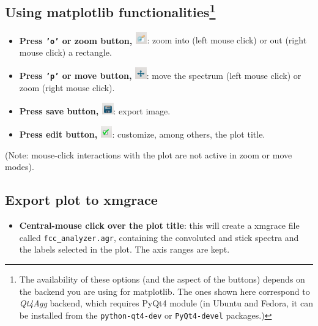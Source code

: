 \documentclass[a4paper,11pt]{article}
\begin{document}
\subsection{Using matplotlib functionalities\footnote{The availability of these options (and the aspect of the buttons) depends on the backend you are using for matplotlib. The ones shown here correspond to \textit{Qt4Agg} backend, which requires PyQt4 module (in Ubuntu and Fedora, it can be installed from the \texttt{python-qt4-dev} or \texttt{PyQt4-devel} packages.)}}
\begin{itemize}
 \item \textbf{Press \texttt{'o'} or zoom button, \includegraphics[width=0.5cm]{figs/butt_zoom.jpg}}: zoom into (left mouse click) or out (right mouse click) a rectangle.
 \item \textbf{Press \texttt{'p'} or move button, \includegraphics[width=0.5cm]{figs/butt_move.jpg}}: move the spectrum (left mouse click) or zoom (right mouse click).
 \item \textbf{Press save button, \includegraphics[width=0.5cm]{figs/butt_save.jpg}}: export image.
 \item \textbf{Press edit button, \includegraphics[width=0.5cm]{figs/butt_edit.jpg}}: customize, among others, the plot title.
\end{itemize}
(Note: mouse-click interactions with the plot are not active in zoom or move modes).

\subsection{Export plot to xmgrace}
\begin{itemize}
 \item \textbf{Central-mouse click over the plot title}: this will create a xmgrace file called \texttt{fcc\_analyzer.agr}, containing the convoluted and stick spectra and the labels selected in the plot. The axis ranges are kept.
\end{itemize}
\end{document}
